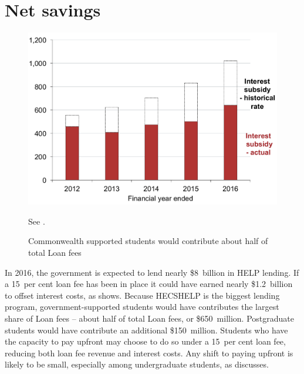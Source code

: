 \documentclass[embargoed]{grattan}
\begin{document}
\section{Net savings}\label{net-savings}

\begin{figure}
\caption{Commonwealth supported students would contribute about half of total \gls{Loan fees}}\label{fig:fig23-Cth-supported-students-would-contr-half-tot-loan-fees}


\includegraphics[page=23]{atlas/Chartpack.pdf}

{See .}
\end{figure}

In 2016, the government is expected to lend nearly \$8~billion in \gls{HELP} lending.
If a 15~per cent loan fee has been in place it could have earned nearly \$1.2~billion to offset interest costs, as  shows.
Because \gls{HECSHELP} is the biggest lending program, government-supported students would have contributes the largest share of \gls{Loan fees} -- about half of total \gls{Loan fees}, or \$650~million.
Postgraduate students would have contribute an additional \$150~million.
Students who have the capacity to pay upfront may choose to do so under a 15~per cent loan fee, reducing both loan fee revenue and interest costs.
Any shift to paying upfront is likely to be small, especially among undergraduate students, as  discusses.
\end{document}
